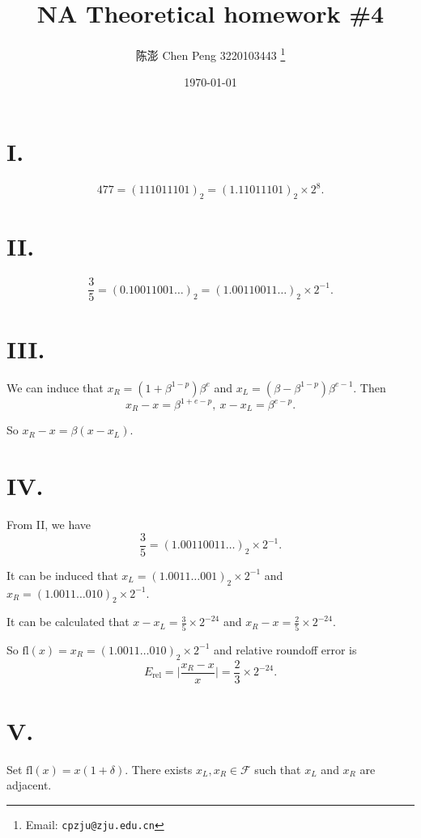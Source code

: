 \documentclass[a4paper]{article}
\begin{document}
\title{NA Theoretical homework \#4}

\author{陈澎 Chen Peng 3220103443
  \thanks{Email: \texttt{cpzju@zju.edu.cn}}}


\date{\today}

\maketitle

\section*{I.}
$$
477=(111011101)_2=(1.11011101)_2\times2^8.
$$

\section*{II.}
$$
\frac{3}{5}=(0.10011001\ldots)_2=(1.00110011\ldots)_2\times 2^{-1}.
$$

\section*{III.}
We can induce that $x_R=(1+\beta^{1-p})\beta^e$ and $x_L=(\beta-\beta^{1-p})\beta^{e-1}$. Then 
$$
x_R-x=\beta^{1+e-p},\ x-x_L=\beta^{e-p}.
$$ 

So $x_R-x=\beta(x-x_L)$.

\section*{IV.}
From II, we have $$\frac{3}{5}=(1.00110011\ldots)_2\times 2^{-1}.$$

It can be induced that $x_L=(1.0011\ldots001)_2\times 2^{-1}$ and $x_R=(1.0011\ldots010)_2\times 2^{-1}$.

It can be calculated that $x-x_L=\frac{3}{5}\times 2^{-24}$ and $x_R-x=\frac{2}{5}\times 2^{-24}$.

So $\mathrm{fl}(x)=x_R=(1.0011\ldots010)_2\times 2^{-1}$ and relative roundoff error is 
$$
E_{\mathrm{rel}}=\lvert \frac{x_R-x}{x}\rvert=\frac{2}{3}\times 2^{-24}.
$$

\section*{V.}
Set $\mathrm{fl}(x)=x(1+\delta)$. There exists $x_L,x_R\in \mathcal{F}$ such that $x_L$ and  $x_R$ are adjacent.
\end{document}
